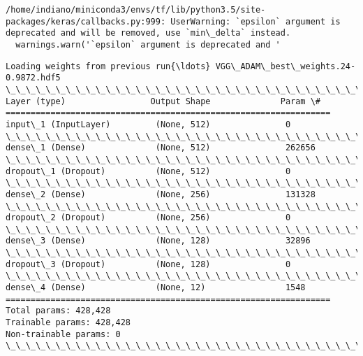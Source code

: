 \documentclass[11pt]{article}
\begin{document}
    \begin{Verbatim}[commandchars=\\\{\}]
/home/indiano/miniconda3/envs/tf/lib/python3.5/site-packages/keras/callbacks.py:999: UserWarning: `epsilon` argument is deprecated and will be removed, use `min\_delta` instead.
  warnings.warn('`epsilon` argument is deprecated and '

    \end{Verbatim}

    \begin{Verbatim}[commandchars=\\\{\}]
Loading weights from previous run{\ldots} VGG\_ADAM\_best\_weights.24-0.9872.hdf5
\_\_\_\_\_\_\_\_\_\_\_\_\_\_\_\_\_\_\_\_\_\_\_\_\_\_\_\_\_\_\_\_\_\_\_\_\_\_\_\_\_\_\_\_\_\_\_\_\_\_\_\_\_\_\_\_\_\_\_\_\_\_\_\_\_
Layer (type)                 Output Shape              Param \#   
=================================================================
input\_1 (InputLayer)         (None, 512)               0         
\_\_\_\_\_\_\_\_\_\_\_\_\_\_\_\_\_\_\_\_\_\_\_\_\_\_\_\_\_\_\_\_\_\_\_\_\_\_\_\_\_\_\_\_\_\_\_\_\_\_\_\_\_\_\_\_\_\_\_\_\_\_\_\_\_
dense\_1 (Dense)              (None, 512)               262656    
\_\_\_\_\_\_\_\_\_\_\_\_\_\_\_\_\_\_\_\_\_\_\_\_\_\_\_\_\_\_\_\_\_\_\_\_\_\_\_\_\_\_\_\_\_\_\_\_\_\_\_\_\_\_\_\_\_\_\_\_\_\_\_\_\_
dropout\_1 (Dropout)          (None, 512)               0         
\_\_\_\_\_\_\_\_\_\_\_\_\_\_\_\_\_\_\_\_\_\_\_\_\_\_\_\_\_\_\_\_\_\_\_\_\_\_\_\_\_\_\_\_\_\_\_\_\_\_\_\_\_\_\_\_\_\_\_\_\_\_\_\_\_
dense\_2 (Dense)              (None, 256)               131328    
\_\_\_\_\_\_\_\_\_\_\_\_\_\_\_\_\_\_\_\_\_\_\_\_\_\_\_\_\_\_\_\_\_\_\_\_\_\_\_\_\_\_\_\_\_\_\_\_\_\_\_\_\_\_\_\_\_\_\_\_\_\_\_\_\_
dropout\_2 (Dropout)          (None, 256)               0         
\_\_\_\_\_\_\_\_\_\_\_\_\_\_\_\_\_\_\_\_\_\_\_\_\_\_\_\_\_\_\_\_\_\_\_\_\_\_\_\_\_\_\_\_\_\_\_\_\_\_\_\_\_\_\_\_\_\_\_\_\_\_\_\_\_
dense\_3 (Dense)              (None, 128)               32896     
\_\_\_\_\_\_\_\_\_\_\_\_\_\_\_\_\_\_\_\_\_\_\_\_\_\_\_\_\_\_\_\_\_\_\_\_\_\_\_\_\_\_\_\_\_\_\_\_\_\_\_\_\_\_\_\_\_\_\_\_\_\_\_\_\_
dropout\_3 (Dropout)          (None, 128)               0         
\_\_\_\_\_\_\_\_\_\_\_\_\_\_\_\_\_\_\_\_\_\_\_\_\_\_\_\_\_\_\_\_\_\_\_\_\_\_\_\_\_\_\_\_\_\_\_\_\_\_\_\_\_\_\_\_\_\_\_\_\_\_\_\_\_
dense\_4 (Dense)              (None, 12)                1548      
=================================================================
Total params: 428,428
Trainable params: 428,428
Non-trainable params: 0
\_\_\_\_\_\_\_\_\_\_\_\_\_\_\_\_\_\_\_\_\_\_\_\_\_\_\_\_\_\_\_\_\_\_\_\_\_\_\_\_\_\_\_\_\_\_\_\_\_\_\_\_\_\_\_\_\_\_\_\_\_\_\_\_\_


\end{Verbatim}
\end{document}
